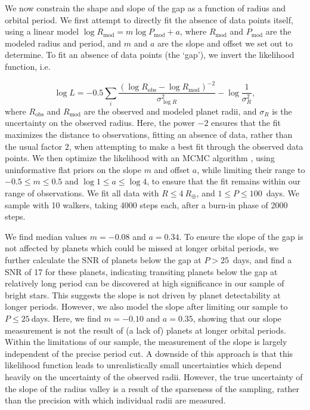 \documentclass[a4paper,fleqn,usenatbib]{mnras}
\begin{document}
We now constrain the shape and slope of the gap as a function of radius and orbital period. We first attempt to directly fit the absence of data points itself, using a linear model $\log R_\mathrm{mod} = m \log P_\mathrm{mod} + a$, where $R_\mathrm{mod}$ and $P_\mathrm{mod}$ are the modeled radius and period, and $m$ and $a$ are the slope and offset we set out to determine. To fit an absence of data points (the `gap'), we invert the likelihood function, i.e. 

\begin{equation}
 \log L = -0.5 \sum_i \frac{(\log R_\mathrm{obs} - \log R_\mathrm{mod})^{-2}}{\sigma_{\log R}^2} - \log{\frac{1}{\sigma_R^2}},
\end{equation}
%
where $R_\mathrm{obs}$ and $R_\mathrm{mod}$ are the observed and modeled planet radii, and $\sigma_R$ is the uncertainty on the observed radius. Here, the power $-2$ ensures that the fit maximizes the distance to observations, fitting an absence of data, rather than the usual factor $2$, when attempting to make a best fit through the observed data points. We then optimize the likelihood with an MCMC algorithm \citep[\protect\textit{emcee,}][]{foremanmackey2013}, using uninformative flat priors on the slope $m$ and offset $a$, while limiting their range to $-0.5 \leq m \leq 0.5$ and $\log 1 \leq a \leq \log 4$, to ensure that the fit remains within our range of observations. We fit all data with $R \leq 4~R_\oplus$, and $1 \leq P \leq 100$~days. We sample with 10 walkers, taking 4000 steps each, after a burn-in phase of 2000 steps.

We find median values $m = -0.08$ and $a = 0.34$. 
%
To ensure the slope of the gap is not affected by planets which could be missed at longer orbital periods, we further calculate the SNR of planets below the gap at $P>25$~days, and find a SNR of 17 for these planets, indicating transiting planets below the gap at relatively long period can be discovered at high significance in our sample of bright stars.
%
This suggests the slope is not driven by planet detectability at longer periods. However, we also model the slope after limiting our sample to $P \leq 25~$days. Here, we find $m = -0.10$ and $a = 0.35$, showing that our slope measurement is not the result of (a lack of) planets at longer orbital periods. Within the limitations of our sample, the measurement of the slope is largely independent of the precise period cut. A downside of this approach is that this likelihood function leads to unrealistically small uncertainties which depend heavily on the uncertainty of the observed radii. However, the true uncertainty of the slope of the radius valley is a result of the sparseness of the sampling, rather than the precision with which individual radii are measured. 
\end{document}
